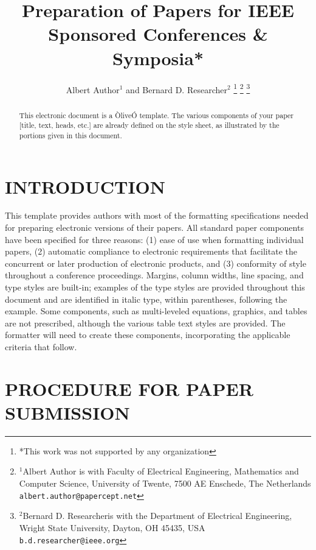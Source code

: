 \documentclass[letterpaper, 10 pt, conference]{ieeeconf}  %
\title{\LARGE \bf
    Preparation of Papers for IEEE Sponsored Conferences \& Symposia*
}
\author{Albert Author$^{1}$ and Bernard D. Researcher$^{2}$%
    \thanks{*This work was not supported by any organization}%
    \thanks{$^{1}$Albert Author is with Faculty of Electrical Engineering, Mathematics and Computer Science,
                University of Twente, 7500 AE Enschede, The Netherlands
                        {\tt\small albert.author@papercept.net}}%
                        \thanks{$^{2}$Bernard D. Researcheris with the Department of Electrical Engineering, Wright State University,
                                    Dayton, OH 45435, USA
                                            {\tt\small b.d.researcher@ieee.org}}%
                                        }
\begin{document}
                                        \maketitle
                                        \thispagestyle{empty}
                                        \pagestyle{empty}


                                        \begin{abstract}

                                            This electronic document is a ÒliveÓ template. The various components of your paper [title, text, heads, etc.] are already defined on the style sheet, as illustrated by the portions given in this document.

                                        \end{abstract}


                                        \section{INTRODUCTION}

                                        \cite{Olson09icra}
                                        This template provides authors with most of the formatting specifications needed for preparing electronic versions of their papers. All standard paper components have been specified for three reasons: (1) ease of use when formatting individual papers, (2) automatic compliance to electronic requirements that facilitate the concurrent or later production of electronic products, and (3) conformity of style throughout a conference proceedings. Margins, column widths, line spacing, and type styles are built-in; examples of the type styles are provided throughout this document and are identified in italic type, within parentheses, following the example. Some components, such as multi-leveled equations, graphics, and tables are not prescribed, although the various table text styles are provided. The formatter will need to create these components, incorporating the applicable criteria that follow.

                                        \section{PROCEDURE FOR PAPER SUBMISSION}
\end{document}

